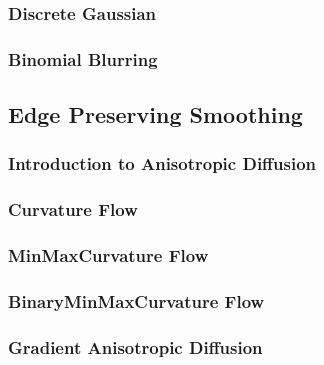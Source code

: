 \subsubsection{Discrete Gaussian}
\label{sec:DiscreteGaussianImageFilter}

%


\subsubsection{Binomial Blurring}
\label{sec:BinomialBlurImageFilter}

%



\subsection{Edge Preserving Smoothing}
\label{sec:EdgePreservingSmoothingFilters}

\subsubsection{Introduction to Anisotropic Diffusion}
%

\subsubsection{Curvature Flow}
\label{sec:CurvatureFlowImageFilter}

%


\subsubsection{MinMaxCurvature Flow}
\label{sec:MinMaxCurvatureFlowImageFilter}

%



\subsubsection{BinaryMinMaxCurvature Flow}
\label{sec:BinaryMinMaxCurvatureFlowImageFilter}

%


\subsubsection{Gradient Anisotropic Diffusion}
\label{sec:GradientAnisotropicDiffusionImageFilter}

